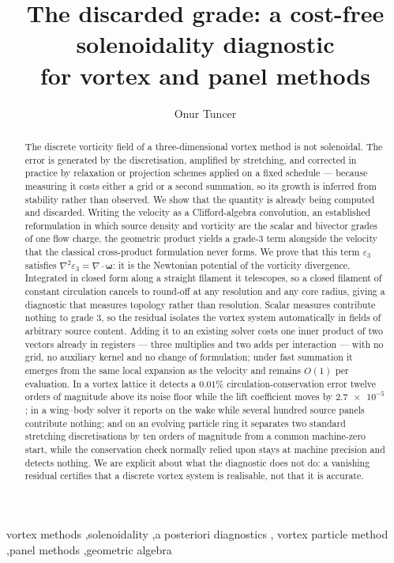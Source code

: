 \documentclass[preprint,12pt,3p]{elsarticle}
\theoremstyle{remark}
\newcommand{\eps}{\varepsilon_3}
\newcommand{\bomega}{\boldsymbol{\omega}}
\begin{document}
\begin{frontmatter}

\title{The discarded grade: a cost-free solenoidality diagnostic\\
for vortex and panel methods}

\author{Onur Tuncer}
\address{Department of Aeronautical Engineering, Istanbul Technical University, Istanbul, Turkey}

\begin{abstract}
The discrete vorticity field of a three-dimensional vortex method is not
solenoidal. The error is generated by the discretisation, amplified by
stretching, and corrected in practice by relaxation or projection schemes
applied on a fixed schedule --- because measuring it costs either a grid or a
second summation, so its growth is inferred from stability rather than
observed. We show that the quantity is already being computed and discarded.
Writing the velocity as a Clifford-algebra convolution, an established
reformulation in which source density and vorticity are the scalar and bivector
grades of one flow charge, the geometric product yields a grade-3 term
alongside the velocity that the classical cross-product formulation never
forms. We prove that this term $\eps$ satisfies $\nabla^2\eps =
\nabla\cdot\bomega$: it is the Newtonian potential of the vorticity divergence.
Integrated in closed form along a straight filament it telescopes, so a closed
filament of constant circulation cancels to round-off at any resolution and any
core radius, giving a diagnostic that measures topology rather than resolution.
Scalar measures contribute nothing to grade 3, so the residual isolates the
vortex system automatically in fields of arbitrary source content. Adding it to
an existing solver costs one inner product of two vectors already in registers
--- three multiplies and two adds per interaction --- with no grid, no auxiliary
kernel and no change of formulation; under fast summation it emerges from the
same local expansion as the velocity and remains $O(1)$ per evaluation. In a
vortex lattice it detects a $0.01\%$ circulation-conservation error twelve
orders of magnitude above its noise floor while the lift coefficient moves by
$\num{2.7e-5}$; in a wing--body solver it reports on the wake while several
hundred source panels contribute nothing; and on an evolving particle ring it
separates two standard stretching discretisations by ten orders of magnitude
from a common machine-zero start, while the conservation check normally relied
upon stays at machine precision and detects nothing. We are explicit about what
the diagnostic does not do: a vanishing residual certifies that a discrete
vortex system is realisable, not that it is accurate.
\end{abstract}

\begin{keyword}
vortex methods \sep solenoidality \sep a posteriori diagnostics \sep
vortex particle method \sep panel methods \sep geometric algebra
\end{keyword}

\end{frontmatter}
\end{document}
